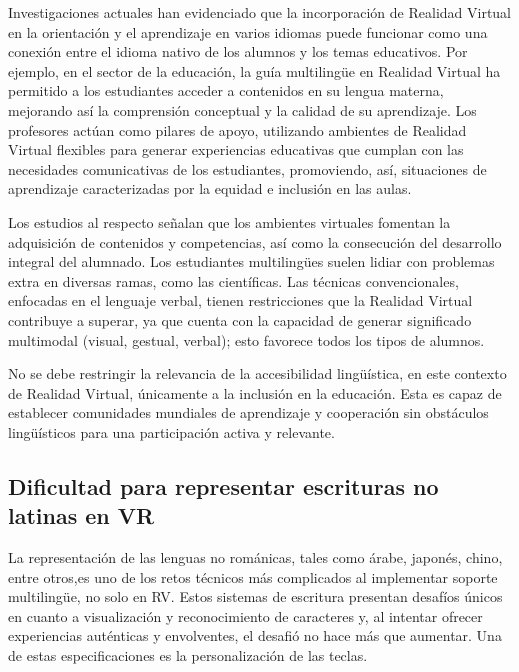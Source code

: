 Investigaciones actuales han evidenciado que la incorporación de Realidad Virtual en la orientación y el aprendizaje en varios idiomas puede funcionar como una conexión entre el idioma nativo de los alumnos y los temas educativos. Por ejemplo, en el sector de la educación, la guía multilingüe en Realidad Virtual ha permitido a los estudiantes acceder a contenidos en su lengua materna, mejorando así la comprensión conceptual y la calidad de su aprendizaje. Los profesores actúan como pilares de apoyo, utilizando ambientes de Realidad Virtual flexibles para generar experiencias educativas que cumplan con las necesidades comunicativas de los estudiantes, promoviendo, así, situaciones de aprendizaje caracterizadas por la equidad e inclusión  en las aulas. \cite{rojas2024} \cite{adaptiveVR}

Los estudios al respecto señalan que los ambientes virtuales fomentan la adquisición de contenidos y competencias, así como la consecución del desarrollo integral del alumnado. Los estudiantes multilingües suelen lidiar con problemas extra en diversas ramas, como las científicas. Las técnicas convencionales, enfocadas en el lenguaje verbal, tienen restricciones que la Realidad Virtual contribuye a superar, ya que cuenta con la capacidad de generar significado multimodal (visual, gestual, verbal); esto favorece todos los tipos de alumnos. \cite{vrscience}

No se debe restringir la relevancia de la accesibilidad lingüística, en este contexto de Realidad Virtual, únicamente a la inclusión en la educación. Esta es capaz de establecer comunidades mundiales de aprendizaje y cooperación sin obstáculos lingüísticos para una participación activa y relevante. \cite{rojas2024} \cite{adaptiveVR} \cite{vrscience}

\subsection{Dificultad para representar escrituras no latinas en VR}

La representación de las lenguas no románicas, tales como árabe, japonés, chino, entre otros,es uno de los retos técnicos más complicados al implementar soporte multilingüe, no solo en RV. Estos sistemas de escritura presentan desafíos únicos en cuanto a visualización y reconocimiento de caracteres y, al intentar ofrecer experiencias auténticas y envolventes, el desafió no hace más que aumentar. Una de estas especificaciones es la personalización de las teclas. \cite{reconviguration} \cite{kat}


